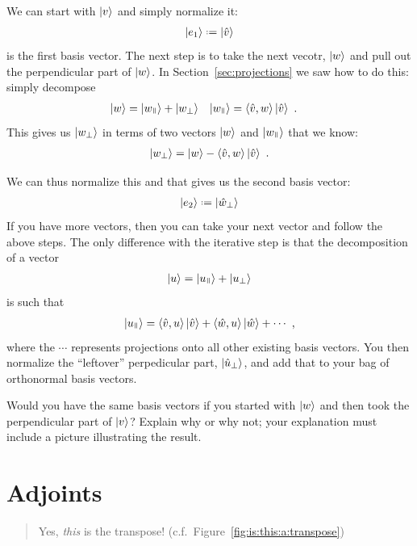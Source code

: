 \documentclass[12pt, oneside]{report}    %
\let\oldsection\section
\def\section{%
  \setcounter{sidenote}{1}%
  \oldsection
}
\begin{document}
We can start with $\left|v\right\rangle$ and simply normalize it:
\begin{align}
    \ket{{e}_1}\defeq \ket{\hat{v}}
\end{align}
is the first basis vector. The next step is to take the next vecotr, $\left|w\right\rangle$ and pull out the perpendicular part of $\left|w\right\rangle$. In Section~\ref{sec:projections} we saw how to do this: simply decompose
\begin{align}
    \ket{w} &= \ket{w_\paral} + \ket{w_\perp}
    &
    \ket{w_\paral} &=  \la {\hat v} , w\ra  \ket{\hat v}  \ .
\end{align}
This gives us $\left|w_\perp\right\rangle$ in terms of two vectors $\left|w\right\rangle$ and $\ket{w_\paral}$ that we know:
\begin{align}
    \left|w_\perp\right\rangle = \left|w\right\rangle - \langle {\hat v} , w \rangle  \left|\hat{v}\right\rangle \ .
\end{align}

 We can thus normalize this and that gives us the second basis vector: 
\begin{align}
    \ket{e_2} \defeq \ket{\hat w_\perp}
\end{align}
If you have more vectors, then you can take your next vector and follow the above steps. The only difference with the iterative step is that the decomposition of a vector 
\begin{align}
\ket{u} = \ket{u_\paral} + \ket{u_\perp}    
\end{align}
is such that
\begin{align}
    \ket{u_\paral} = \la \hat{v}, u \ra \ket{\hat{v}} + \la \hat{w}, u \ra \ket{\hat{w}} + \cdots \ ,
\end{align}
where the $\cdots$ represents projections onto all other existing basis vectors. You then normalize the ``leftover'' perpedicular part, $\left|\hat{u}_\perp\right\rangle$, and add that to your bag of orthonormal basis vectors.


\begin{exercise}
Would you have the same basis vectors if you started with $\left|w\right\rangle$ and then took the perpendicular part of $\left|v\right\rangle$? Explain why or why not; your explanation must include a picture illustrating the result.
\end{exercise}


\section{Adjoints}
\label{sec:adjoint}

\begin{quote}
Yes, \emph{this} is the transpose! (c.f.~Figure~\ref{fig:is:this:a:transpose})
\end{quote}
\end{document}
